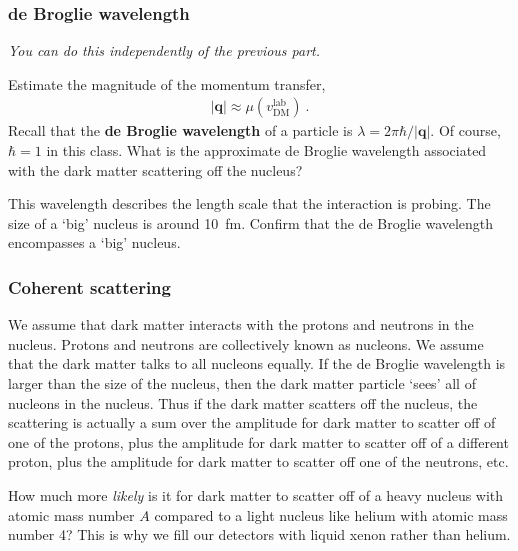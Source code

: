 \documentclass[12pt]{article}
\renewcommand{\vec}[1]{\mathbf{#1}} %
\begin{document}
\subsubsection{de Broglie wavelength}

\emph{You can do this independently of the previous part.} 

Estimate the magnitude of the momentum transfer,
\begin{align}
	|\vec q| \approx \mu (v_\text{DM}^\text{lab}) \ .
\end{align}
Recall that the \textbf{de Broglie wavelength} of a particle is $\lambda = 2\pi\hbar/|\vec q|$. Of course, $\hbar = 1$ in this class. What is the approximate de Broglie wavelength associated with the dark matter scattering off the nucleus?

This wavelength describes the length scale that the interaction is probing. The size of a `big' nucleus is around 10~fm. Confirm that the de Broglie wavelength encompasses a `big' nucleus.

\subsubsection{Coherent scattering}

We assume that dark matter interacts with the protons and neutrons in the nucleus. Protons and neutrons are collectively known as nucleons. We assume that the dark matter talks to all nucleons equally.
If the de Broglie wavelength is larger  than the size of the nucleus, then the dark matter particle `sees' all of nucleons in the nucleus. Thus if the dark matter scatters off the nucleus, the scattering is actually a sum over the amplitude for dark matter to scatter off of one of the protons, plus the amplitude for dark matter to scatter off of a different proton, plus the amplitude for dark matter to scatter off one of the neutrons, etc.

How much more \emph{likely} is it for dark matter to scatter off of a heavy nucleus with atomic mass number $A$ compared to a light nucleus like helium with atomic mass number 4? This is why we fill our detectors with liquid xenon rather than helium.
\end{document}
